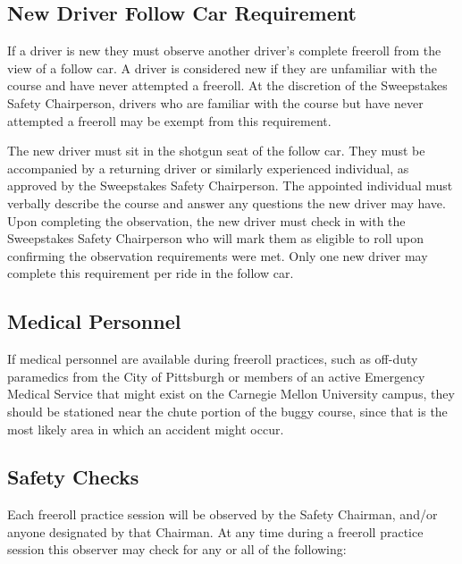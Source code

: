 \subsection{New Driver Follow Car Requirement}
\label{subsec:New Driver Follow Car}

    If a driver is new they must observe another driver's complete freeroll from the view of a follow car. A driver is considered new if they are unfamiliar with the course and have never attempted a freeroll. At the discretion of the Sweepstakes Safety Chairperson, drivers who are familiar with the course but have never attempted a freeroll may be exempt from this requirement.

    The new driver must sit in the shotgun seat of the follow car. They must be accompanied by a returning driver or similarly experienced individual, as approved by the Sweepstakes Safety Chairperson. The appointed individual must verbally describe the course and answer any questions the new driver may have. Upon completing the observation, the new driver must check in with the Sweepstakes Safety Chairperson who will mark them as eligible to roll upon confirming the observation requirements were met. Only one new driver may complete this requirement per ride in the follow car.

\subsection{Medical Personnel}

	If medical personnel are available during freeroll practices, such as off-duty paramedics from the City of Pittsburgh or members of an active Emergency Medical Service that might exist on the Carnegie Mellon University campus, they should be stationed near the chute portion of the buggy course, since that is the most likely area in which an accident might occur.

\subsection{Safety Checks}

	Each freeroll practice session will be observed by the Safety Chairman, and/or anyone designated by that Chairman. At any time during a freeroll practice session this observer may check for any or all of the following:

